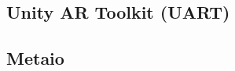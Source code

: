 		\subsection{Unity AR Toolkit (UART)} \label{ssec:uart}
		\subsection{Metaio} \label{ssec:metaio}
	
